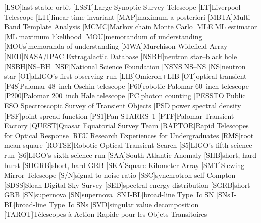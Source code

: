 \begin{acronym}
[LSO]{last stable orbit}
[LSST]{Large Synoptic Survey Telescope}
[LT]{Liverpool Telescope}
[LTI]{linear time invariant}
[MAP]{maximum a posteriori}
[MBTA]{Multi-Band Template Analysis}
[MCMC]{Markov chain Monte Carlo}
[MLE]{\ac{ML} estimator}
[ML]{maximum likelihood}
[MOU]{memorandum of understanding}
[MOUs]{memoranda of understanding}
[MWA]{Murchison Widefield Array}
[NED]{NASA/IPAC Extragalactic Database}
[NSBH]{neutron star\nobreakdashes--black hole}
[NSBH]{\acl{NS}\nobreakdashes--\acl{BH}}
[NSF]{National Science Foundation}
[NSNS]{\acl{NS}\nobreakdashes--\acl{NS}}
[NS]{neutron star}
[O1]{\acl{aLIGO}'s first observing run}
[LIB]{Omicron+\acl{LIB}}
[OT]{optical transient}
[P48]{Palomar 48~inch Oschin telescope}
[P60]{robotic Palomar 60~inch telescope}
[P200]{Palomar 200~inch Hale telescope}
[PC]{photon counting}
[PESSTO]{Public ESO Spectroscopic Survey of Transient Objects}
[PSD]{power spectral density}
[PSF]{point-spread function}
[PS1]{Pan\nobreakdashes-STARRS~1}
[PTF]{Palomar Transient Factory}
[QUEST]{Quasar Equatorial Survey Team}
[RAPTOR]{Rapid Telescopes for Optical Response}
[REU]{Research Experiences for Undergraduates}
[RMS]{root mean square}
[ROTSE]{Robotic Optical Transient Search}
[S5]{\ac{LIGO}'s fifth science run}
[S6]{\ac{LIGO}'s sixth science run}
[SAA]{South Atlantic Anomaly}
[SHB]{short, hard burst}
[SHGRB]{short, hard \acl{GRB}}
[SKA]{Square Kilometer Array}
[SMT]{Slewing Mirror Telescope}
[S/N]{signal\nobreakdashes-to\nobreakdashes-noise ratio}
[SSC]{synchrotron self\nobreakdashes-Compton}
[SDSS]{Sloan Digital Sky Survey}
[SED]{spectral energy distribution}
[SGRB]{short \acl{GRB}}
[SN]{supernova}
[SN]{supernova}
[\acs{SN}\,I\nobreakdashes-BL]{broad\nobreakdashes-line Type~Ic \ac{SN}}
[\acsp{SN}\,I\nobreakdashes-BL]{broad\nobreakdashes-line Type~Ic \acp{SN}}
[SVD]{singular value decomposition}
[TAROT]{T\'{e}lescopes \`{a} Action Rapide pour les Objets Transitoires}

\end{acronym}
